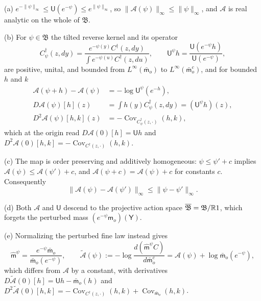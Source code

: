(a) $e^{-\lVert\psi\rVert_\infty}\le\mathsf U(e^{-\psi})\le e^{\lVert\psi\rVert_\infty}$,
so $\lVert\mathcal A(\psi)\rVert_\infty\le\lVert\psi\rVert_\infty$, and $\mathcal A$
is real analytic on the whole of $\mathfrak B$.

(b) For $\psi\in\mathfrak B$ the tilted reverse kernel and its operator
\begin{equation}
C^\dagger_\psi(z,dy)=
\frac{e^{-\psi(y)}C^\dagger(z,dy)}{\int e^{-\psi(u)}C^\dagger(z,du)},
\qquad
\mathsf U^\psi h=\frac{\mathsf U(e^{-\psi}h)}{\mathsf U(e^{-\psi})},
\label{eq:rg-tilted-reverse-kernel}
\end{equation}
are positive, unital, and bounded from $L^\infty(\bar{\mathsf m}_o)$ to
$L^\infty(\bar{\mathsf m}_o^c)$, and for bounded $h$ and $k$
\begin{align}
\mathcal A(\psi+h)-\mathcal A(\psi)&=-\log\mathsf U^\psi(e^{-h}),
\label{eq:rg-action-recentering-identity}\\
D\mathcal A(\psi)[h](z)&=\int h(y)C^\dagger_\psi(z,dy)=(\mathsf U^\psi h)(z),
\label{eq:rg-action-first-frechet-general}\\
D^2\mathcal A(\psi)[h,k](z)&=
-\operatorname{Cov}_{C^\dagger_\psi(z,\cdot)}(h,k),
\label{eq:rg-action-second-frechet-general}
\end{align}
which at the origin read $D\mathcal A(0)[h]=\mathsf Uh$ and
$D^2\mathcal A(0)[h,k]=-\operatorname{Cov}_{C^\dagger(z,\cdot)}(h,k)$.

(c) The map is order preserving and additively homogeneous:
$\psi\le\psi'+c$ implies $\mathcal A(\psi)\le\mathcal A(\psi')+c$, and
$\mathcal A(\psi+c)=\mathcal A(\psi)+c$ for constants $c$. Consequently
\begin{equation}
\lVert\mathcal A(\psi)-\mathcal A(\psi')\rVert_\infty
\le\lVert\psi-\psi'\rVert_\infty .
\label{eq:rg-nonlinear-action-sup-contraction}
\end{equation}

(d) Both $\mathcal A$ and $\mathsf U$ descend to the projective action space
$\overline{\mathfrak B}=\mathfrak B/\mathbb R1$, which forgets the perturbed mass
$(e^{-\psi}\mathsf m_o)(\mathsf Y)$.

(e) Normalizing the perturbed fine law instead gives
\begin{equation}
\widehat{\mathsf m}^\psi
=\frac{e^{-\psi}\bar{\mathsf m}_o}{\bar{\mathsf m}_o(e^{-\psi})},
\qquad
\widetilde{\mathcal A}(\psi)
:=-\log\frac{d(\widehat{\mathsf m}^\psi C)}{d\bar{\mathsf m}_o^c}
=\mathcal A(\psi)+\log\bar{\mathsf m}_o(e^{-\psi}),
\label{eq:rg-normalized-perturbation-action}
\end{equation}
which differs from $\mathcal A$ by a constant, with derivatives
$D\widetilde{\mathcal A}(0)[h]=\mathsf Uh-\bar{\mathsf m}_o(h)$ and
$D^2\widetilde{\mathcal A}(0)[h,k]=-\operatorname{Cov}_{C^\dagger(z,\cdot)}(h,k)
+\operatorname{Cov}_{\bar{\mathsf m}_o}(h,k)$. 


